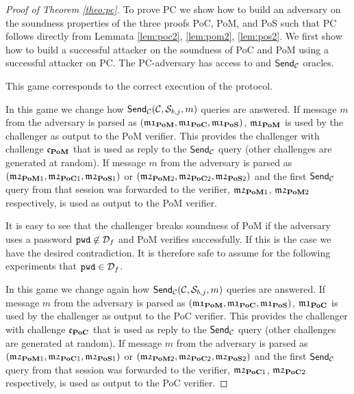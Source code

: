 
\begin{proof}[Proof of Theorem \ref{theo:pc}]
To prove \ac{PC} we show how to build an adversary on the soundness properties of the three proofs \ac{PoC}, \ac{PoM}, and \ac{PoS} such that \ac{PC} follows directly from Lemmata \ref{lem:poc2}, \ref{lem:pom2}, \ref{lem:pos2}.
We first show how to build a successful attacker on the soundness of \ac{PoC} and \ac{PoM} using a successful attacker on \ac{PC}.
The \ac{PC}-adversary has access to \Setup and $\mathsf{Send}_\mathcal{C}$ oracles.

 This game corresponds to the correct execution of the protocol.

 In this game we change how $\mathsf{Send}_\mathcal{C}(\mathcal{C}, \mathcal{S}_{b,j}, m)$ queries are answered.
If message $m$ from the adversary is parsed as $(\mathfrak{m1}_\mathsf{\bf PoM},\mathfrak{m1}_\mathsf{\bf PoC},\mathfrak{m1}_\mathsf{\bf PoS})$, $\mathfrak{m1}_\mathsf{\bf PoM}$ is used by the challenger as output to the \ac{PoM} verifier.
This provides the challenger with challenge $\mathfrak{c}_\mathsf{\bf PoM}$ that is used as reply to the $\mathsf{Send}_\mathcal{C}$ query (other challenges are generated at random).
If message $m$ from the adversary is parsed as $(\mathfrak{m2}_{\mathsf{\bf PoM}1},\mathfrak{m2}_{\mathsf{\bf PoC}1},\mathfrak{m2}_{\mathsf{\bf PoS}1})$ or $(\mathfrak{m2}_{\mathsf{\bf PoM}2},\mathfrak{m2}_{\mathsf{\bf PoC}2},\mathfrak{m2}_{\mathsf{\bf PoS}2})$ and the first $\mathsf{Send}_\mathcal{C}$ query from that session was forwarded to the verifier, $\mathfrak{m2}_{\mathsf{\bf PoM}1}$, $\mathfrak{m2}_{\mathsf{\bf PoM}2}$ respectively, is used as output to the \ac{PoM} verifier.

It is easy to see that the challenger breaks soundness of \ac{PoM} if the adversary uses a password $\mathtt{pwd}\not\in\mathcal{D}_f$ and \ac{PoM} verifies successfully.
If this is the case we have the desired contradiction.
It is therefore safe to assume for the following experiments that $\mathtt{pwd}\in\mathcal{D}_f$.

In this game we change again how $\mathsf{Send}_\mathcal{C}(\mathcal{C}, \mathcal{S}_{b,j}, m)$ queries are answered.
If message $m$ from the adversary is parsed as $(\mathfrak{m1}_\mathsf{\bf PoM},\mathfrak{m1}_\mathsf{\bf PoC},\mathfrak{m1}_\mathsf{\bf PoS})$, $\mathfrak{m1}_\mathsf{\bf PoC}$ is used by the challenger as output to the \ac{PoC} verifier.
This provides the challenger with challenge $\mathfrak{c}_\mathsf{\bf PoC}$ that is used as reply to the $\mathsf{Send}_\mathcal{C}$ query (other challenges are generated at random).
If message $m$ from the adversary is parsed as $(\mathfrak{m2}_{\mathsf{\bf PoM}1},\mathfrak{m2}_{\mathsf{\bf PoC}1},\mathfrak{m2}_{\mathsf{\bf PoS}1})$ or $(\mathfrak{m2}_{\mathsf{\bf PoM}2},\mathfrak{m2}_{\mathsf{\bf PoC}2},\mathfrak{m2}_{\mathsf{\bf PoS}2})$ and the first $\mathsf{Send}_\mathcal{C}$ query from that session was forwarded to the verifier, $\mathfrak{m2}_{\mathsf{\bf PoC}1}$, $\mathfrak{m2}_{\mathsf{\bf PoC}2}$ respectively, is used as output to the \ac{PoC} verifier.


\end{proof}
